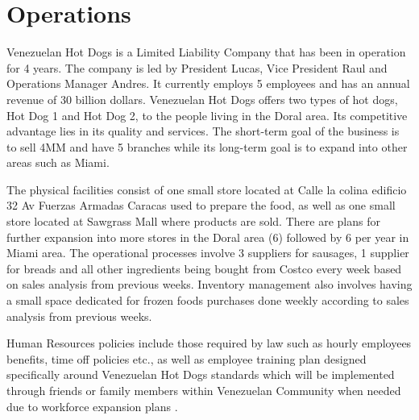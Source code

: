 

\section{Operations}\label{sec:operations} Venezuelan Hot Dogs is a Limited Liability Company that has been in operation for 4 years. The company is led by President Lucas, Vice President Raul and Operations Manager Andres. It currently employs 5 employees and has an annual revenue of 30 billion dollars. Venezuelan Hot Dogs offers two types of hot dogs, Hot Dog 1 and Hot Dog 2, to the people living in the Doral area. Its competitive advantage lies in its quality and services. The short-term goal of the business is to sell 4MM and have 5 branches while its long-term goal is to expand into other areas such as Miami.  

The physical facilities consist of one small store located at Calle la colina edificio 32 Av Fuerzas Armadas Caracas used to prepare the food, as well as one small store located at Sawgrass Mall where products are sold. There are plans for further expansion into more stores in the Doral area (6) followed by 6 per year in Miami area. The operational processes involve 3 suppliers for sausages, 1 supplier for breads and all other ingredients being bought from Costco every week based on sales analysis from previous weeks. Inventory management also involves having a small space dedicated for frozen foods purchases done weekly according to sales analysis from previous weeks. 
 
Human Resources policies include those required by law such as hourly employees benefits, time off policies etc., as well as employee training plan designed specifically around Venezuelan Hot Dogs standards which will be implemented through friends or family members within Venezuelan Community when needed due to workforce expansion plans .    

